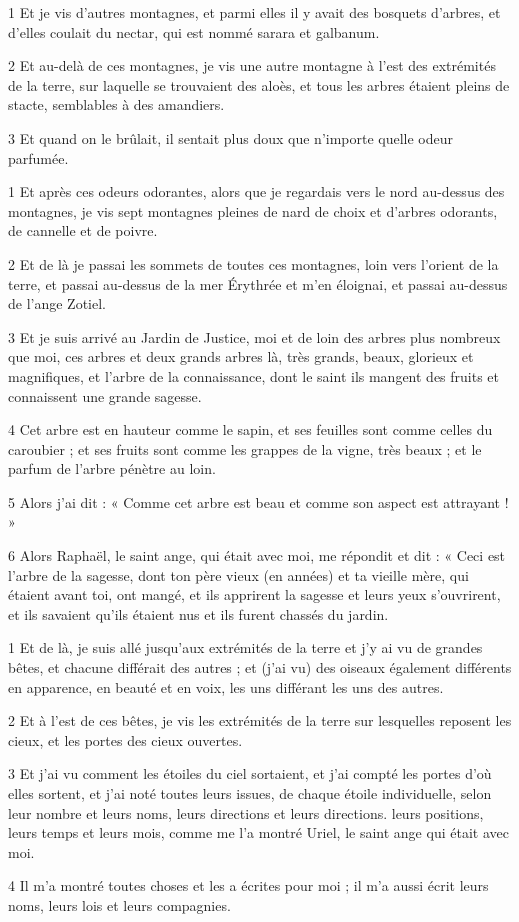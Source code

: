 
\par 1 Et je vis d'autres montagnes, et parmi elles il y avait des bosquets d'arbres, et d'elles coulait du nectar, qui est nommé sarara et galbanum.
\par 2 Et au-delà de ces montagnes, je vis une autre montagne à l'est des extrémités de la terre, sur laquelle se trouvaient des aloès, et tous les arbres étaient pleins de stacte, semblables à des amandiers.
\par 3 Et quand on le brûlait, il sentait plus doux que n'importe quelle odeur parfumée.


\par 1 Et après ces odeurs odorantes, alors que je regardais vers le nord au-dessus des montagnes, je vis sept montagnes pleines de nard de choix et d'arbres odorants, de cannelle et de poivre.
\par 2 Et de là je passai les sommets de toutes ces montagnes, loin vers l'orient de la terre, et passai au-dessus de la mer Érythrée et m'en éloignai, et passai au-dessus de l'ange Zotiel.
\par 3 Et je suis arrivé au Jardin de Justice, moi et de loin des arbres plus nombreux que moi, ces arbres et deux grands arbres là, très grands, beaux, glorieux et magnifiques, et l'arbre de la connaissance, dont le saint ils mangent des fruits et connaissent une grande sagesse.
\par 4 Cet arbre est en hauteur comme le sapin, et ses feuilles sont comme celles du caroubier ; et ses fruits sont comme les grappes de la vigne, très beaux ; et le parfum de l'arbre pénètre au loin.
\par 5 Alors j'ai dit : « Comme cet arbre est beau et comme son aspect est attrayant ! »
\par 6 Alors Raphaël, le saint ange, qui était avec moi, me répondit et dit : « Ceci est l'arbre de la sagesse, dont ton père vieux (en années) et ta vieille mère, qui étaient avant toi, ont mangé, et ils apprirent la sagesse et leurs yeux s'ouvrirent, et ils savaient qu'ils étaient nus et ils furent chassés du jardin.


\par 1 Et de là, je suis allé jusqu'aux extrémités de la terre et j'y ai vu de grandes bêtes, et chacune différait des autres ; et (j'ai vu) des oiseaux également différents en apparence, en beauté et en voix, les uns différant les uns des autres.
\par 2 Et à l'est de ces bêtes, je vis les extrémités de la terre sur lesquelles reposent les cieux, et les portes des cieux ouvertes.
\par 3 Et j'ai vu comment les étoiles du ciel sortaient, et j'ai compté les portes d'où elles sortent, et j'ai noté toutes leurs issues, de chaque étoile individuelle, selon leur nombre et leurs noms, leurs directions et leurs directions. leurs positions, leurs temps et leurs mois, comme me l'a montré Uriel, le saint ange qui était avec moi.
\par 4 Il m'a montré toutes choses et les a écrites pour moi ; il m'a aussi écrit leurs noms, leurs lois et leurs compagnies.

